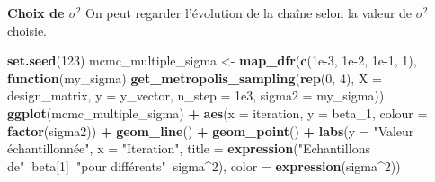 \documentclass[]{article}
\newenvironment{Shaded}{\begin{snugshade}}{\end{snugshade}}
\newcommand{\ControlFlowTok}[1]{\textcolor[rgb]{0.13,0.29,0.53}{\textbf{#1}}}
\newcommand{\DataTypeTok}[1]{\textcolor[rgb]{0.13,0.29,0.53}{#1}}
\newcommand{\DecValTok}[1]{\textcolor[rgb]{0.00,0.00,0.81}{#1}}
\newcommand{\FloatTok}[1]{\textcolor[rgb]{0.00,0.00,0.81}{#1}}
\newcommand{\KeywordTok}[1]{\textcolor[rgb]{0.13,0.29,0.53}{\textbf{#1}}}
\newcommand{\NormalTok}[1]{#1}
\newcommand{\OperatorTok}[1]{\textcolor[rgb]{0.81,0.36,0.00}{\textbf{#1}}}
\newcommand{\StringTok}[1]{\textcolor[rgb]{0.31,0.60,0.02}{#1}}
\newenvironment{Correction}%
  { \vspace{\baselineskip}\begin{mdframed}[backgroundcolor=my_green]}%
  {\end{mdframed}}
\begin{document}
\begin{Correction}
\textbf{Choix de $\sigma^2$} On peut regarder l'évolution de la chaîne selon la valeur de $\sigma^2$ choisie.
\end{Correction}

\begin{Shaded}
\begin{Highlighting}[]
\KeywordTok{set.seed}\NormalTok{(}\DecValTok{123}\NormalTok{)}
\NormalTok{mcmc_multiple_sigma <-}\StringTok{ }\KeywordTok{map_dfr}\NormalTok{(}\KeywordTok{c}\NormalTok{(}\FloatTok{1e-3}\NormalTok{, }\FloatTok{1e-2}\NormalTok{, }\FloatTok{1e-1}\NormalTok{, }\DecValTok{1}\NormalTok{),}
                               \ControlFlowTok{function}\NormalTok{(my_sigma)}
                                 \KeywordTok{get_metropolis_sampling}\NormalTok{(}\KeywordTok{rep}\NormalTok{(}\DecValTok{0}\NormalTok{, }\DecValTok{4}\NormalTok{), }
                                                         \DataTypeTok{X =}\NormalTok{ design_matrix, }
                                                         \DataTypeTok{y =}\NormalTok{ y_vector, }
                                                         \DataTypeTok{n_step =} \FloatTok{1e3}\NormalTok{, }
                                                         \DataTypeTok{sigma2 =}\NormalTok{ my_sigma))}
\KeywordTok{ggplot}\NormalTok{(mcmc_multiple_sigma) }\OperatorTok{+}
\StringTok{  }\KeywordTok{aes}\NormalTok{(}\DataTypeTok{x =}\NormalTok{ iteration, }\DataTypeTok{y =}\NormalTok{ beta_}\DecValTok{1}\NormalTok{, }\DataTypeTok{colour =} \KeywordTok{factor}\NormalTok{(sigma2)) }\OperatorTok{+}
\StringTok{  }\KeywordTok{geom_line}\NormalTok{() }\OperatorTok{+}
\StringTok{  }\KeywordTok{geom_point}\NormalTok{() }\OperatorTok{+}
\StringTok{  }\KeywordTok{labs}\NormalTok{(}\DataTypeTok{y =} \StringTok{"Valeur échantillonnée"}\NormalTok{, }\DataTypeTok{x =} \StringTok{"Iteration"}\NormalTok{, }
       \DataTypeTok{title =} \KeywordTok{expression}\NormalTok{(}\StringTok{"Echantillons de"}\OperatorTok{~}\NormalTok{beta[}\DecValTok{1}\NormalTok{]}\OperatorTok{~}\StringTok{"pour différents"}\OperatorTok{~}\NormalTok{sigma}\OperatorTok{^}\DecValTok{2}\NormalTok{),}
       \DataTypeTok{color =} \KeywordTok{expression}\NormalTok{(sigma}\OperatorTok{^}\DecValTok{2}\NormalTok{))}
\end{Highlighting}
\end{Shaded}
\end{document}
